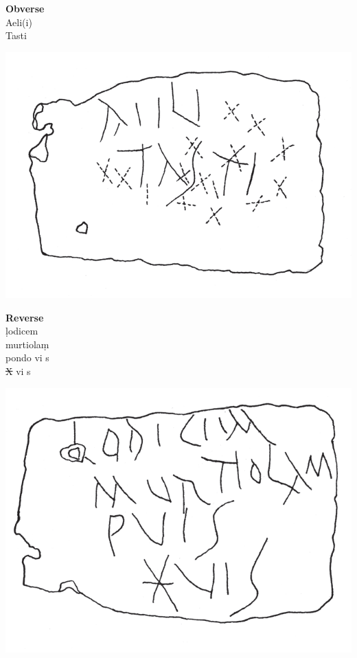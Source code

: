 \documentclass[amsthm,ebook]{saparticle}
\begin{document}
\vspace{0,3cm}
\begin{minipage}[t]{0.18\textwidth}
\textbf{Obverse}\\
Aeli(i)\\
Tasti
\end{minipage}
\begin{minipage}[c]{0.27\textwidth}
\includegraphics[width=\columnwidth]{EAGLE16lameetalteaching-img006.png}
\end{minipage}
\begin{minipage}[t]{0.18\textwidth}
\textbf{Reverse}\\
\d{l}odicem\\
murtiola\d{m}\\
pondo vi s\\
\sout{X} vi s\\
\end{minipage}
\begin{minipage}[c]{0.25\textwidth}
\includegraphics[width=\columnwidth]{EAGLE16lameetalteaching-img007.png}
\end{minipage}
\end{document}
